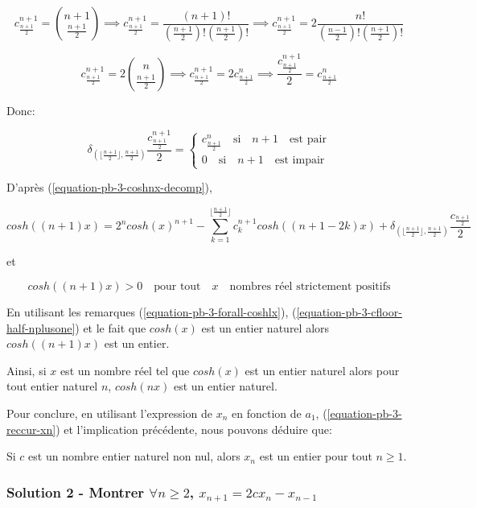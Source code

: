 \documentclass[12pt,a4paper,article]{memoir}
\newcommand{\floor}[1]{\lfloor #1 \rfloor}
\begin{document}
\[c_{\frac{n+1}{2}}^{n+1} = \binom{n+1}{\frac{n+1}{2}} \implies c_{\frac{n+1}{2}}^{n+1} = \frac{(n+1)!}{(\frac{n+1}{2})!(\frac{n+1}{2})!}  \implies c_{\frac{n+1}{2}}^{n+1} = 2 \frac{n!}{(\frac{n-1}{2})!(\frac{n+1}{2})!} \]

\[c_{\frac{n+1}{2}}^{n+1} = 2\binom{n}{\frac{n+1}{2}} \implies c_{\frac{n+1}{2}}^{n+1} = 2c_{\frac{n+1}{2}}^{n} \implies \frac{c_{\frac{n+1}{2}}^{n+1}}{2} = c_{\frac{n+1}{2}}^{n} \]

Donc: 

\begin{equation}
\delta_{(\floor{\frac{n+1}{2}}, \frac{n+1}{2})} \frac{c_{\frac{n+1}{2}}^{n+1}}{2} = \left\{
	\begin{array}{l}
	c_{\frac{n+1}{2}}^{n} \quad \textrm{si} \quad n+1 \quad \textrm{est pair}\\
	0 \quad \textrm{si} \quad n+1 \quad \textrm{est impair}
	\end{array}
\right.
\label{equation-pb-3-cfloor-half-nplusone}
\end{equation}

D'après (\ref{equation-pb-3-coshnx-decomp}),

\[cosh((n+1)x) = 2^{n}cosh(x)^{n+1} - \sum_{k=1}^{\floor{\frac{n+1}{2}}} c_{k}^{n+1} cosh((n+1-2k)x) + \delta_{(\floor{\frac{n+1}{2}}, \frac{n+1}{2})} \frac{c_{\frac{n+1}{2}}}{2}\]

et 

\[cosh((n+1)x) > 0 \quad \textrm{pour tout} \quad x \quad \textrm{nombres réel strictement positifs}\]

En utilisant les remarques (\ref{equation-pb-3-forall-coshlx}), (\ref{equation-pb-3-cfloor-half-nplusone}) et le fait que $cosh(x)$ est un entier naturel alors $cosh((n+1)x)$ est un entier.

\bigskip

Ainsi, si $x$ est un nombre réel tel que $cosh(x)$ est un entier naturel alors pour tout entier naturel $n$, $cosh(nx)$ est un entier naturel.

\bigskip

Pour conclure, en utilisant l'expression de $x_{n}$ en fonction de $a_{1}$, (\ref{equation-pb-3-reccur-xn}) et l'implication précédente, nous pouvons déduire que:

\bigskip

Si $c$ est un nombre entier naturel non nul, alors $x_{n}$ est un entier pour tout $n \geq 1$.
 
\subsubsection{Solution 2 - Montrer $\forall n \geq 2$, $x_{n+1} = 2cx_{n} - x_{n-1}$}
\end{document}
